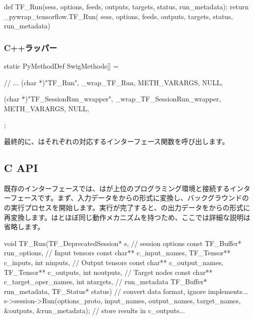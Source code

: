 \begin{content}
\begin{leftbar}
\begin{python}[caption={tensorflow/bazel-bin/tensorflow/python/pywrap\_tensorflow\_internal.py}]
def TF_Run(sess, options, feeds, outputs, 
  targets, status, run_metadata):
  return _pywrap_tensorflow.TF_Run(
    sess, options, feeds, outputs, targets, status, run_metadata)
\end{python}
\end{leftbar}

\subsubsection{C++ラッパー}

\begin{leftbar}
\begin{c++}[caption={tensorflow/bazel-bin/tensorflow/python/pywrap\_tensorflow\_internal.cc}]
static PyMethodDef SwigMethods[] = {
  // ...
  { (char *)"TF_Run", 
    _wrap_TF_Run, METH_VARARGS, NULL},

  { (char *)"TF_SessionRun_wrapper", 
    _wrap_TF_SessionRun_wrapper, METH_VARARGS, NULL},
};
\end{c++}
\end{leftbar}

最終的に、はそれぞれの対応するインターフェース関数を呼び出します。

\subsection{C API}

既存のインターフェースでは、はが上位のプログラミング環境と接続するインターフェースです。まず、入力データをから\cpp{}の形式に変換し、バックグラウンドのの実行プロセスを開始します。実行が完了すると、の出力データを\cpp{}からの形式に再変換します。はとほぼ同じ動作メカニズムを持つため、ここでは詳細な説明は省略します。

\begin{leftbar}
\begin{c++}[caption={tensorflow/c/c\_api.c}]
void TF_Run(TF_DeprecatedSession* s, 
  // session options
  const TF_Buffer* run_options,
  // Input tensors
  const char** c_input_names, TF_Tensor** c_inputs, int ninputs,
  // Output tensors
  const char** c_output_names, TF_Tensor** c_outputs, int noutputs,
  // Target nodes
  const char** c_target_oper_names, int ntargets,
  // run\_metadata
  TF_Buffer* run_metadata, TF_Status* status) {
  // convert data format, ignore implements...
  s->session->Run(options_proto, input_names, output_names,
                  target_names, &outputs, &run_metadata); 
  // store results in c\_outputs...
}


\end{c++}
\end{leftbar}
\end{content}
